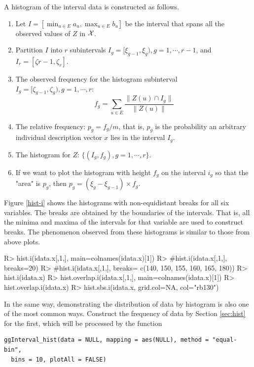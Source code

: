 \documentclass[article]{jss}
\begin{document}
A histogram of the interval data is constructed as follows.
\begin{enumerate}
\item Let $I = [\min_{u \in E} a_u, \max_{u \in E} b_u]$ be
the interval that spans all the observed values of $Z$ in $\cal X$.
\item
Partition $I$ into $r$ subintervals $I_g =[\xi_{g-1}, \xi_g),
g =1, \cdots, r-1$, and $I_r = [\zeta{r-1}, \zeta_r]$. 
\item
The observed frequency for the histogram subinterval $I_g=[\zeta_{g-1}, 
\zeta_g), g=1, \cdots, r$:
\[
f_g =\sum_{u \in E}\frac{\|Z(u)\cap I_g\|}{\|Z(u)\|}
\]
\item
The relative frequency:  $p_g = f_g/m$, 
that is, $p_g$ is the probability an arbitrary individual description
vector $x$ lies in the interval $I_g$. 
\item The histogram for $Z$: $\{(I_g, f_g), g=1, \cdots, r\}$.
\item
If we want to plot the histogram
with height $f_g$ on the interval $i_g$ so that the "area" is $p_g$, then
$p_g = (\xi_g -\xi_{g-1}) \times f_g$.  
\end{enumerate}
Figure \ref{hist-i} shows
the histograms with non-equidistant breaks for all six
variables. The breaks are obtained by the boundaries of the
intervals. That is, all the minima and maxima of
the intervals for that variable are used to construct
breaks. The phenomenon observed from these histograms is
similar to those from above plots.

\begin{CodeChunk}
\begin{CodeInput}
R> hist.i(idata.x[,1,], main=colnames(idata.x)[1])
R> #hist.i(idata.x[,1,], breaks=20)
R> #hist.i(idata.x[,1,], breaks= c(140, 150, 155, 160, 165, 180))
R> hist.i(idata.x)
R> hist.overlap.i(idata.x[,1,], main=colnames(idata.x)[1])
R> hist.overlap.i(idata.x)
R> hist.sbs.i(idata.x, grid.col=NA, col="rb130")
\end{CodeInput}
\end{CodeChunk}


In the same way, demonstrating the distribution of data by histogram is also one of the most common ways. Construct the frequency of data by Section \ref{sec:hist} for the first, which will be processed by the function

\begin{verbatim}
ggInterval_hist(data = NULL, mapping = aes(NULL), method = "equal-bin",
  bins = 10, plotAll = FALSE)
\end{verbatim}
\end{document}
